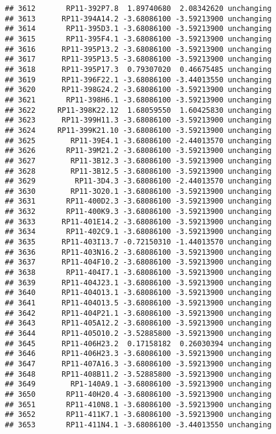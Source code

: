 \documentclass[]{article}
\begin{document}
\begin{verbatim}
## 3612       RP11-392P7.8  1.89740680  2.08342620 unchanging
## 3613      RP11-394A14.2 -3.68086100 -3.59213900 unchanging
## 3614       RP11-395D3.1 -3.68086100 -3.59213900 unchanging
## 3615       RP11-395F4.1 -3.68086100 -3.59213900 unchanging
## 3616      RP11-395P13.2 -3.68086100 -3.59213900 unchanging
## 3617      RP11-395P13.5 -3.68086100 -3.59213900 unchanging
## 3618      RP11-395P17.3  0.79307020  0.46675485 unchanging
## 3619      RP11-396F22.1 -3.68086100 -3.44013550 unchanging
## 3620      RP11-398G24.2 -3.68086100 -3.59213900 unchanging
## 3621       RP11-398H6.1 -3.68086100 -3.59213900 unchanging
## 3622     RP11-398K22.12  1.68059550  1.60425830 unchanging
## 3623      RP11-399H11.3 -3.68086100 -3.59213900 unchanging
## 3624     RP11-399K21.10 -3.68086100 -3.59213900 unchanging
## 3625        RP11-39E4.1 -3.68086100 -2.44013570 unchanging
## 3626       RP11-39M21.2 -3.68086100 -3.59213900 unchanging
## 3627        RP11-3B12.3 -3.68086100 -3.59213900 unchanging
## 3628        RP11-3B12.5 -3.68086100 -3.59213900 unchanging
## 3629         RP11-3D4.3 -3.68086100 -2.44013570 unchanging
## 3630        RP11-3O20.1 -3.68086100 -3.59213900 unchanging
## 3631       RP11-400D2.3 -3.68086100 -3.59213900 unchanging
## 3632       RP11-400K9.3 -3.68086100 -3.59213900 unchanging
## 3633      RP11-401E14.2 -3.68086100 -3.59213900 unchanging
## 3634       RP11-402C9.1 -3.68086100 -3.59213900 unchanging
## 3635      RP11-403I13.7 -0.72150310 -1.44013570 unchanging
## 3636      RP11-403N16.2 -3.68086100 -3.59213900 unchanging
## 3637      RP11-404F10.2 -3.68086100 -3.59213900 unchanging
## 3638       RP11-404I7.1 -3.68086100 -3.59213900 unchanging
## 3639      RP11-404J23.1 -3.68086100 -3.59213900 unchanging
## 3640      RP11-404O13.1 -3.68086100 -3.59213900 unchanging
## 3641      RP11-404O13.5 -3.68086100 -3.59213900 unchanging
## 3642      RP11-404P21.1 -3.68086100 -3.59213900 unchanging
## 3643      RP11-405A12.2 -3.68086100 -3.59213900 unchanging
## 3644      RP11-405O10.2 -3.52885800 -3.59213900 unchanging
## 3645      RP11-406H23.2  0.17158182  0.26030394 unchanging
## 3646      RP11-406H23.3 -3.68086100 -3.59213900 unchanging
## 3647      RP11-407A16.3 -3.68086100 -3.59213900 unchanging
## 3648      RP11-408B11.2 -3.52885800 -3.59213900 unchanging
## 3649        RP1-140A9.1 -3.68086100 -3.59213900 unchanging
## 3650       RP11-40H20.4 -3.68086100 -3.59213900 unchanging
## 3651       RP11-410N8.1 -3.68086100 -3.59213900 unchanging
## 3652       RP11-411K7.1 -3.68086100 -3.59213900 unchanging
## 3653       RP11-411N4.1 -3.68086100 -3.44013550 unchanging

\end{verbatim}
\end{document}
